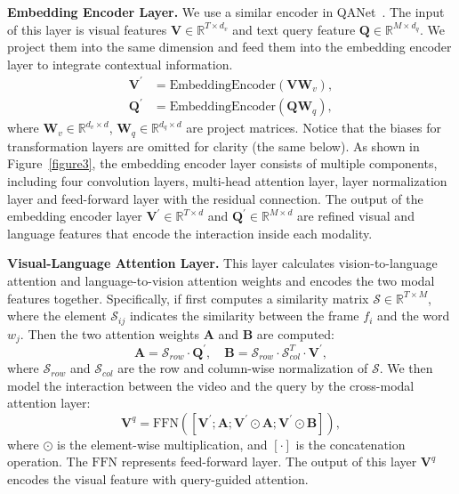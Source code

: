 \documentclass[letterpaper]{article} %
\begin{document}
\noindent\textbf{Embedding Encoder Layer.}
We use a similar encoder in QANet~\cite{DBLP:conf/iclr/YuDLZ00L18}.
The input of this layer is visual features $\bm{V} \in \mathbb{R}^{T\times d_{v}}$ and text query feature $\bm{Q}\in\mathbb{R}^{M\times d_{q}}$.
We project them into the same dimension and feed them into the embedding encoder layer to integrate contextual information.
\begin{equation} \label{equation1}
\begin{split}
\bm{V}^{'} & =\text{EmbeddingEncoder}(\bm{V}\bm{W}_{v}), \\
\bm{Q}^{'} & =\text{EmbeddingEncoder}(\bm{Q}\bm{W}_{q}),
\end{split}
\end{equation}
where $\bm{W}_{v}\in\mathbb{R}^{d_{v}\times d}$, $\bm{W}_{q}\in\mathbb{R}^{d_{q}\times d}$ are project matrices.
Notice that the biases for transformation layers are omitted for clarity (the same below).
As shown in Figure~\ref{figure3}, the embedding encoder layer consists of multiple components,
including four convolution layers, multi-head attention layer, layer normalization layer and feed-forward layer with the residual connection.
The output of the embedding encoder layer $\bm{V}^{'} \in \mathbb{R}^{T\times d}$ and $\bm{Q}^{'}\in\mathbb{R}^{M\times d}$ are refined visual and language features that encode the interaction inside each modality.

\noindent\textbf{Visual-Language Attention Layer.}
This layer calculates vision-to-language attention and language-to-vision attention weights and encodes the two modal features together.
Specifically, if first computes a similarity matrix $\mathcal{S}\in\mathbb{R}^{T\times M}$, where the element $\mathcal{S}_{ij}$
indicates the similarity between the frame $f_{i}$ and the word $w_{j}$.
Then the two attention weights $\bm{A}$ and $\bm{B}$ are computed:
\begin{equation}
\bm{A} = \mathcal{S}_{row}\cdot\bm{Q}^{'}, \quad \bm{B} = \mathcal{S}_{row}\cdot\mathcal{S}_{col}^{T}\cdot\bm{V}^{'},
\label{equation2}
\end{equation}
where $\mathcal{S}_{row}$ and $\mathcal{S}_{col}$ are the row and column-wise normalization of $\mathcal{S}$.
We then model the interaction between the video and the query by the cross-modal attention layer:
\begin{equation}
\bm{V}^{q}=\text{FFN}([\bm{V}^{'};\bm{A};\bm{V}^{'}\odot\bm{A};\bm{V}^{'}\odot\bm{B}]),
\label{equation3}
\end{equation}
where $\odot$ is the element-wise multiplication, and $[\cdot]$ is the concatenation operation. The $\text{FFN}$ represents feed-forward layer. The output of this layer $\bm{V}^{q}$ encodes the visual feature with query-guided attention.
\end{document}
